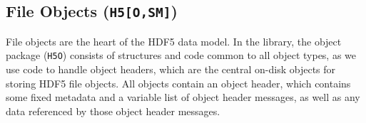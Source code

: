 \subsection{File Objects (\texttt{H5[O,SM]})}



File objects are the heart of the HDF5 data model. In the library, the object package (\texttt{H5O}) consists of structures and code common to all object types, as we use code to handle object headers, which are the central on-disk objects for storing HDF5 file objects. All objects contain an object header, which contains some fixed metadata and a variable list of object header messages, as well as any data referenced by those object header messages.

